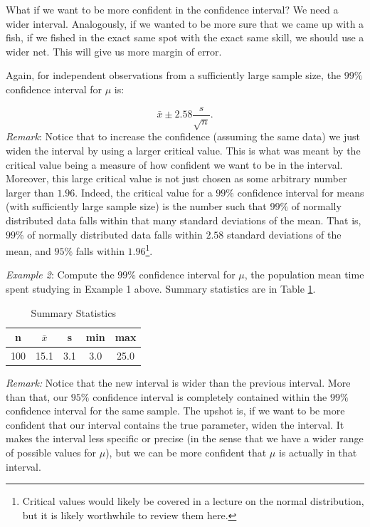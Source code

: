 \documentclass[11pt]{article}
\begin{document}
What if we want to be more confident in the confidence interval?  We need a wider interval.  Analogously, if we wanted to be more sure that we came up with a fish, if we fished in the exact same spot with the exact same skill, we should use a wider net.  This will give us more margin of error.  

Again, for independent observations from a sufficiently large sample size, the $99\%$ confidence interval for $\mu$ is:

\begin{equation} 
\bar{x} \pm 2.58\frac{s}{\sqrt{n}}.
\end{equation}
\textit{Remark}: Notice that to increase the confidence (assuming the same data) we just widen the interval by using a larger critical value.  This is what was meant by the critical value being a measure of how confident we want to be in the interval.  Moreover, this large critical value is not just chosen as some arbitrary number larger than $1.96$.  Indeed, the critical value for a $99\%$ confidence interval for means (with sufficiently large sample size) is the number such that $99\%$ of normally distributed data falls within that many standard deviations of the mean.  That is, $99\%$ of normally distributed data falls within $2.58$ standard deviations of the mean, and $95\%$ falls within $1.96$\footnote{Critical values would likely be covered in a lecture on the normal distribution, but it is likely worthwhile to review them here.}.  

\textit{Example 2}: 
Compute the $99\%$ confidence interval for $\mu$, the population mean time spent studying in Example 1 above.   Summary statistics are in Table \ref{tab:summary2}.  

\begin{table}[ht]
    \centering
    \begin{tabular}{ccccc}
        \toprule
        n & $\bar{x}$ & s & min & max \\
        \midrule
        100 & 15.1 & 3.1 & 3.0 & 25.0 \\
        \bottomrule
    \end{tabular}
    \caption{Summary Statistics}
    \label{tab:summary2}
\end{table} 
 \textit{}
 \textit{Remark:} Notice that the new interval is wider than the previous interval.  More than that, our $95\%$ confidence interval is completely contained within the $99\%$ confidence interval for the same sample.  The upshot is, if we want to be more confident that our interval contains the true parameter, widen the interval.  It makes the interval less specific or precise (in the sense that we have a wider range of possible values for $\mu$), but we can be more confident that $\mu$ is actually in that interval.  
 
\end{document}
